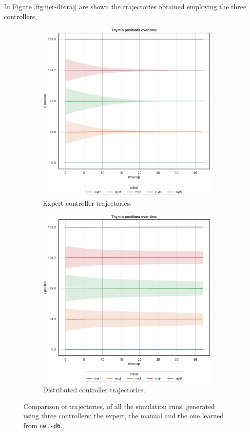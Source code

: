 In Figure \ref{fig:net-d6traj} are shown the trajectories obtained employing the 
three controllers, 
\begin{figure}[!htb]
	\begin{center}
		\begin{subfigure}[h]{0.49\textwidth}
			\centering
			\includegraphics[width=.9\textwidth]{contents/images/net-d6/position-overtime-omniscient}%
			\caption{Expert controller trajectories.}
		\end{subfigure}
		\hfill
		\begin{subfigure}[h]{0.49\textwidth}
			\centering
			\includegraphics[width=.9\textwidth]{contents/images/net-d6/position-overtime-learned_distributed}
			\caption{Distributed controller trajectories.}
		\end{subfigure}
	\end{center}
	\caption[Evaluation of the trajectories learned by \texttt{net-d6}.]{Comparison 
	of trajectories, of all the simulation runs, generated using three controllers: the 
	expert, the manual and the one learned from \texttt{net-d6}.}
\end{figure}
